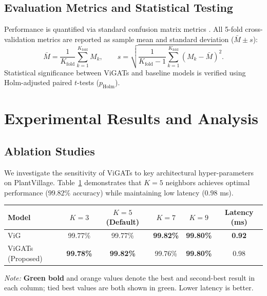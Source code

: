 \documentclass[]{interact}
\theoremstyle{plain}
\theoremstyle{definition}
\theoremstyle{remark}
\newcommand{\bestresult}[1]{\textcolor{bestgreen}{\textbf{#1}}}
\newcommand{\secondresult}[1]{\textcolor{secondorange}{#1}}
\begin{document}
\subsection{Evaluation Metrics and Statistical Testing}
\label{subsec:evaluation_metrics}

Performance is quantified via standard confusion matrix metrics \citep{sokolova2009systematic}. All 5-fold cross-validation metrics are reported as sample mean and standard deviation ($\bar{M} \pm s$):
\begin{equation}
\bar{M} = \frac{1}{K_{\mathrm{fold}}} \sum_{k=1}^{K_{\mathrm{fold}}} M_k, \qquad
s = \sqrt{\frac{1}{K_{\mathrm{fold}} - 1} \sum_{k=1}^{K_{\mathrm{fold}}} (M_k - \bar{M})^2}.
\end{equation}
Statistical significance between ViGATs and baseline models is verified using Holm-adjusted paired $t$-tests ($p_{\mathrm{Holm}}$).


\section{Experimental Results and Analysis}
\label{sec:results}

\subsection{Ablation Studies}
\label{sec:ablation}

We investigate the sensitivity of ViGATs to key architectural hyper-parameters on PlantVillage. Table~\ref{tab:ablation_k} demonstrates that $K=5$ neighbors achieves optimal performance ($99.82\%$ accuracy) while maintaining low latency ($0.98$ ms).

\begin{table}[H]
\small
{}
{\begin{tabular}{lccccc} \toprule
\textbf{Model} & \textbf{$K=3$} & \textbf{$K=5$ (Default)} & \textbf{$K=7$} & \textbf{$K=9$} & \textbf{Latency (ms)} \\ \midrule
ViG \citep{han2022vision} & \secondresult{99.77\%} & \secondresult{99.77\%} & \bestresult{99.82\%} & \bestresult{99.80\%} & \bestresult{0.92} \\
ViGATs (Proposed) & \bestresult{99.78\%} & \bestresult{99.82\%} & \secondresult{99.76\%} & \bestresult{99.80\%} & \secondresult{0.98} \\ \bottomrule
\end{tabular}}
\label{tab:ablation_k}
\parbox{\textwidth}{\vspace{2pt}\footnotesize\textit{Note:} \bestresult{Green bold} and \secondresult{orange} values denote the best and second-best result in each column; tied best values are both shown in green. Lower latency is better.}
\end{table}
\end{document}
